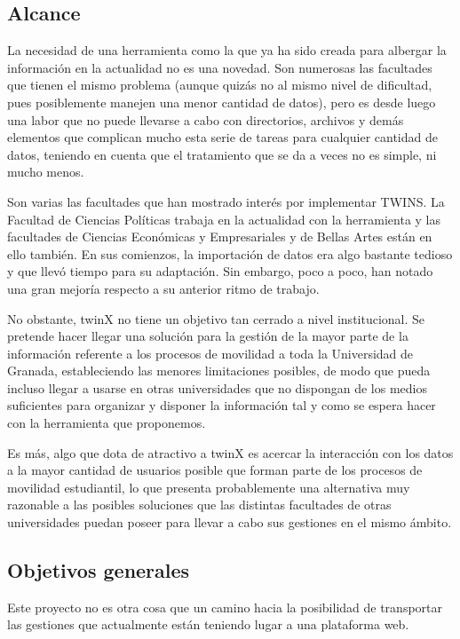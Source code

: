 \subsection{Alcance}

La necesidad de una herramienta como la que ya ha sido creada para albergar la información en la actualidad no es una novedad. Son numerosas las facultades que tienen el mismo problema (aunque quizás no al mismo nivel de dificultad, pues posiblemente manejen una menor cantidad de datos), pero es desde luego una labor que no puede llevarse a cabo con directorios, archivos y demás elementos que complican mucho esta serie de tareas para cualquier cantidad de datos, teniendo en cuenta que el tratamiento que se da a veces no es simple, ni mucho menos.

Son varias las facultades que han mostrado interés por implementar TWINS. La Facultad de Ciencias Políticas trabaja en la actualidad con la herramienta y las facultades de Ciencias Económicas y Empresariales y de Bellas Artes están en ello también. En sus comienzos, la importación de datos era algo bastante tedioso y que llevó tiempo para su adaptación. Sin embargo, poco a poco, han notado una gran mejoría respecto a su anterior ritmo de trabajo.

No obstante, twinX no tiene un objetivo tan cerrado a nivel institucional. Se pretende hacer llegar una solución para la gestión de la mayor parte de la información referente a los procesos de movilidad a toda la Universidad de Granada, estableciendo las menores limitaciones posibles, de modo que pueda incluso llegar a usarse en otras universidades que no dispongan de los medios suficientes para organizar y disponer la información tal y como se espera hacer con la herramienta que proponemos.

Es más, algo que dota de atractivo a twinX es acercar la interacción con los datos a la mayor cantidad de usuarios posible que forman parte de los procesos de movilidad estudiantil, lo que presenta probablemente una alternativa muy razonable a las posibles soluciones que las distintas facultades de otras universidades puedan poseer para llevar a cabo sus gestiones en el mismo ámbito.

\subsection{Objetivos generales}

Este proyecto no es otra cosa que un camino hacia la posibilidad de transportar las gestiones que actualmente están teniendo lugar a una plataforma web.

